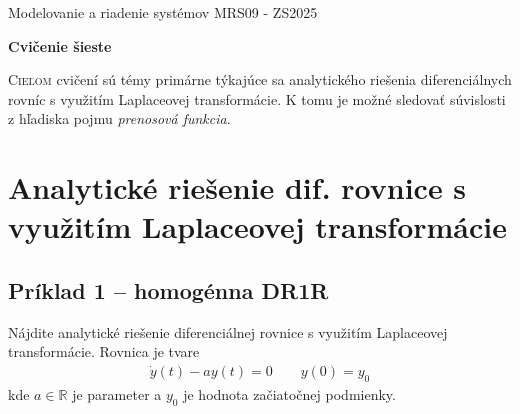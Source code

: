 \documentclass[a4paper, 10pt, ]{article}
\def\oznacenieCasti{MRS09 - ZS2025}
\begin{document}
\lstset{%
style=mystyle,
rangebeginprefix=\#\#\#\ cellB\ ,%
rangebeginsuffix=\ \#\#\#,%
rangeendprefix=\#\#\#\ cellE\ ,%
rangeendsuffix=\ \#\#\#,%
includerangemarker=false,
}






\fontsize{12pt}{22pt}\selectfont

\centerline{\textsf{Modelovanie a riadenie systémov} \hfill \textsf{\oznacenieCasti}}

\fontsize{18pt}{22pt}\selectfont





\begin{flushleft}
	\textbf{\textsf{Cvičenie šieste}}
\end{flushleft}






\normalsize

\bigskip

{\hypersetup{hidelinks}

\tableofcontents

}

\bigskip

\vspace{18pt}



\noindent
\lettrine[lines=3, nindent=0pt]{C}{ieľom} cvičení sú témy primárne týkajúce sa analytického riešenia diferenciálnych rovníc s využitím Laplaceovej transformácie. K tomu je možné sledovať súvislosti z hľadiska pojmu \emph{prenosová funkcia}.




\section{Analytické riešenie dif. rovnice s využitím Laplaceovej transformácie}


\subsection{Príklad 1 --  homogénna DR1R}

Nájdite analytické riešenie diferenciálnej rovnice s využitím Laplaceovej transformácie. Rovnica je tvare
\begin{align}
    \dot y(t) - a y(t) = 0 \qquad y(0) = y_0
\end{align}
kde $a \in \mathbb R$ je parameter a $y_0$ je hodnota začiatočnej podmienky. 
\end{document}
